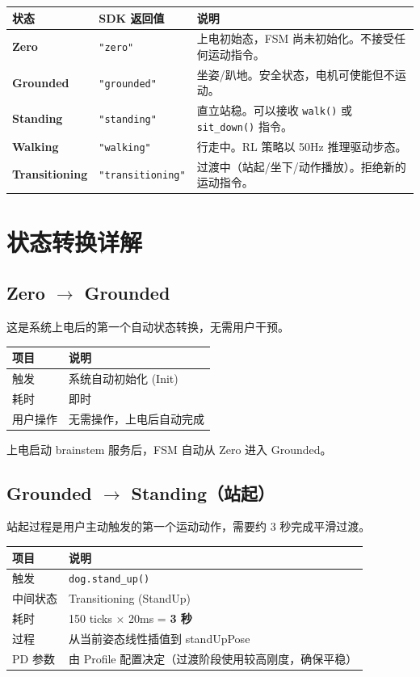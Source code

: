 \documentclass[a4paper,11pt,openany]{book}
\begin{document}
\begin{longtable}{lll}
\toprule
状态 & SDK 返回值 & 说明 \\
\midrule
\endhead
\textbf{Zero} & \texttt{"zero"} & 上电初始态，FSM 尚未初始化。不接受任何运动指令。 \\
\textbf{Grounded} & \texttt{"grounded"} & 坐姿/趴地。安全状态，电机可使能但不运动。 \\
\textbf{Standing} & \texttt{"standing"} & 直立站稳。可以接收 \texttt{walk()} 或 \texttt{sit\_down()} 指令。 \\
\textbf{Walking} & \texttt{"walking"} & 行走中。RL 策略以 50Hz 推理驱动步态。 \\
\textbf{Transitioning} & \texttt{"transitioning"} & 过渡中（站起/坐下/动作播放）。拒绝新的运动指令。 \\
\bottomrule
\end{longtable}

\section{状态转换详解}

\subsection{Zero $\to$ Grounded}

这是系统上电后的第一个自动状态转换，无需用户干预。

\begin{longtable}{ll}
\toprule
项目 & 说明 \\
\midrule
\endhead
触发 & 系统自动初始化 (Init) \\
耗时 & 即时 \\
用户操作 & 无需操作，上电后自动完成 \\
\bottomrule
\end{longtable}

上电启动 brainstem 服务后，FSM 自动从 Zero 进入 Grounded。

\subsection{Grounded $\to$ Standing（站起）}

站起过程是用户主动触发的第一个运动动作，需要约 3 秒完成平滑过渡。

\begin{longtable}{ll}
\toprule
项目 & 说明 \\
\midrule
\endhead
触发 & \texttt{dog.stand\_up()} \\
中间状态 & Transitioning (StandUp) \\
耗时 & 150 ticks $\times$ 20ms = \textbf{3 秒} \\
过程 & 从当前姿态线性插值到 standUpPose \\
PD 参数 & 由 Profile 配置决定（过渡阶段使用较高刚度，确保平稳） \\
\bottomrule
\end{longtable}
\end{document}
